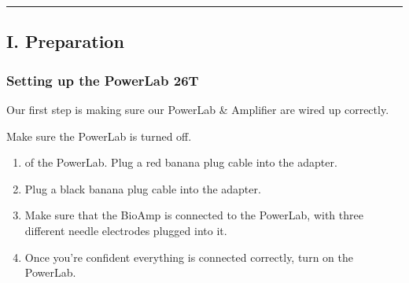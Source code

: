 \documentclass[letterpaper,10pt,english]{jupyterBook}
\begin{document}
\bigskip\hrule\bigskip



\subsection{I. Preparation}
\label{\detokenize{Earthworm:i-preparation}}

\subsubsection{Setting up the PowerLab 26T}
\label{\detokenize{Earthworm:setting-up-the-powerlab-26t}}
\sphinxAtStartPar
Our first step is making sure our PowerLab \& Amplifier are wired up correctly.

\sphinxAtStartPar
Make sure the PowerLab is turned off.
\begin{enumerate}
%
\item {} 
\sphinxAtStartPar
{} of the PowerLab. Plug a red banana plug cable into the adapter.

\item {} 
\sphinxAtStartPar
{} Plug a black banana plug cable into the adapter.

\item {} 
\sphinxAtStartPar
Make sure that the BioAmp is connected to the PowerLab, with three different needle electrodes plugged into it.

\item {} 
\sphinxAtStartPar
Once you’re confident everything is connected correctly, turn on the PowerLab.

\end{enumerate}

\sphinxAtStartPar
{}
\end{document}

